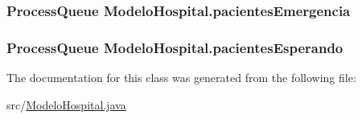 \hypertarget{class_modelo_hospital_a6a2e3dd496eac896ac92232d283db1be}{
\subsubsection[{pacientes\-Emergencia}]{\setlength{\rightskip}{0pt plus 5cm}Process\-Queue Modelo\-Hospital.\-pacientes\-Emergencia}}\label{class_modelo_hospital_a6a2e3dd496eac896ac92232d283db1be}
\hypertarget{class_modelo_hospital_ad0cbe7f57f1733551b2bb33e1a90499a}{
\subsubsection[{pacientes\-Esperando}]{\setlength{\rightskip}{0pt plus 5cm}Process\-Queue Modelo\-Hospital.\-pacientes\-Esperando}}\label{class_modelo_hospital_ad0cbe7f57f1733551b2bb33e1a90499a}


The documentation for this class was generated from the following file\-:\begin{DoxyCompactItemize}
\item 
src/\hyperlink{_modelo_hospital_8java}{Modelo\-Hospital.\-java}\end{DoxyCompactItemize}
